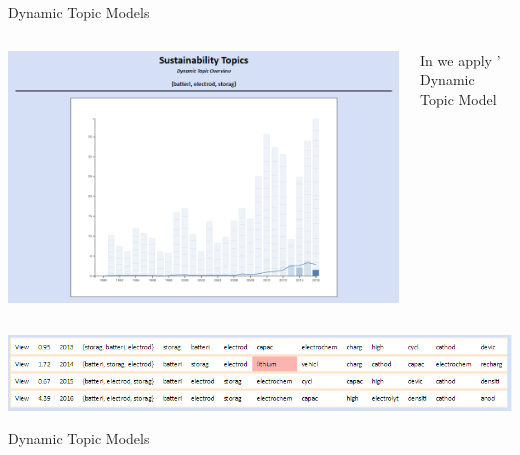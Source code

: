 \documentclass[9pt]{beamer}
\begin{document}
\begin{frame}{Dynamic Topic Models}


\begin{columns}
	\begin{column}{0.5\linewidth}
		\includegraphics[width=\linewidth]{images/sus_batteries.png}
	\end{column}
	
	\begin{column}{0.5\linewidth}	
		In \citep{Minx2017} we apply \citet{Greene2016}' Dynamic Topic Model
	\end{column}
\end{columns}

\bigskip

	\includegraphics[width=\linewidth]{images/sus_batteries_words.png}	

\end{frame}

\begin{frame}[t]{Dynamic Topic Models}



\end{frame}
\end{document}
